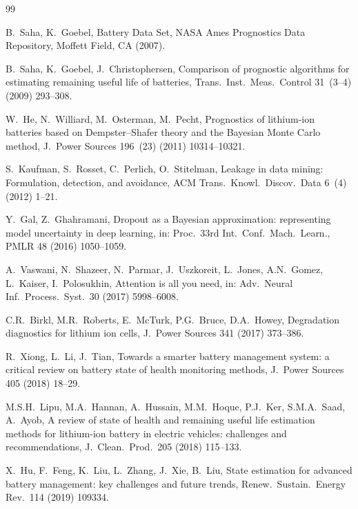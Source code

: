 \begin{thebibliography}{99}

B.~Saha, K.~Goebel,
Battery Data Set,
NASA Ames Prognostics Data Repository,
Moffett Field, CA (2007).

B.~Saha, K.~Goebel, J.~Christophersen,
Comparison of prognostic algorithms for estimating remaining useful life of batteries,
Trans.\ Inst.\ Meas.\ Control 31~(3--4) (2009) 293--308.

W.~He, N.~Williard, M.~Osterman, M.~Pecht,
Prognostics of lithium-ion batteries based on Dempster--Shafer theory and the Bayesian Monte Carlo method,
J.\ Power Sources 196~(23) (2011) 10314--10321.

S.~Kaufman, S.~Rosset, C.~Perlich, O.~Stitelman,
Leakage in data mining: Formulation, detection, and avoidance,
ACM Trans.\ Knowl.\ Discov.\ Data 6~(4) (2012) 1--21.

Y.~Gal, Z.~Ghahramani,
Dropout as a Bayesian approximation: representing model uncertainty in deep learning,
in: Proc.\ 33rd Int.\ Conf.\ Mach.\ Learn., PMLR 48 (2016) 1050--1059.

A.~Vaswani, N.~Shazeer, N.~Parmar, J.~Uszkoreit, L.~Jones, A.N.~Gomez, L.~Kaiser, I.~Polosukhin,
Attention is all you need,
in: Adv.\ Neural Inf.\ Process.\ Syst.\ 30 (2017) 5998--6008.

C.R.~Birkl, M.R.~Roberts, E.~McTurk, P.G.~Bruce, D.A.~Howey,
Degradation diagnostics for lithium ion cells,
J.\ Power Sources 341 (2017) 373--386.

R.~Xiong, L.~Li, J.~Tian,
Towards a smarter battery management system: a critical review on battery state of health monitoring methods,
J.\ Power Sources 405 (2018) 18--29.

M.S.H.~Lipu, M.A.~Hannan, A.~Hussain, M.M.~Hoque, P.J.~Ker, S.M.A.~Saad, A.~Ayob,
A review of state of health and remaining useful life estimation methods for lithium-ion battery in electric vehicles: challenges and recommendations,
J.\ Clean.\ Prod.\ 205 (2018) 115--133.

X.~Hu, F.~Feng, K.~Liu, L.~Zhang, J.~Xie, B.~Liu,
State estimation for advanced battery management: key challenges and future trends,
Renew.\ Sustain.\ Energy Rev.\ 114 (2019) 109334.


\end{thebibliography}
